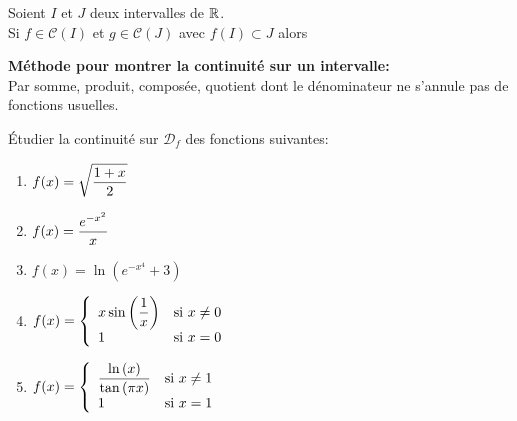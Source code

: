 \documentclass[a4paper, 11pt]{article}
\begin{document}
{\noindent

\begin{prop}
	Soient $I$ et $J$ deux intervalles de $\mathbb{R}$. \vsec\\
	Si $f\in\mathcal{C}(I)$ et $g\in\mathcal{C}(J)$ avec $f(I)\subset J$ alors \dotfill \vsec
\end{prop}



\textbf{M\'ethode pour montrer la continuit\'e sur un intervalle:}\vsec\\
Par somme, produit, compos\'ee, quotient dont le d\'enominateur ne s'annule pas de fonctions usuelles.\vsec

{\footnotesize \begin{exercice} \'Etudier la continuit\'e sur $\mathcal{D}_f$ des fonctions suivantes:
		\begin{enumerate}

			\item $f(x)=\displaystyle\sqrt{\frac{1+x}{2}}$
			\item $f(x)=\displaystyle\frac{e^{-x^2}}{x}$
			\item $f(x)=\ln{(e^{-x^4} +3)}$


			\item $f(x)=\left\lbrace\begin{array}{ll} x\sin{\left(\displaystyle\frac{1}{x} \right)} &\hbox{si}\ x\not=0\\ 1 & \hbox{si}\ x=0  \end{array}\right.$
			\item $f(x)=\left\lbrace\begin{array}{ll} \displaystyle\frac{\ln{(x)}}{\tan{(\pi x)}} &\hbox{si}\ x\not=1\\ 1 & \hbox{si}\ x=1   \end{array}\right. $

		\end{enumerate}
	\end{exercice}}



}
\end{document}
